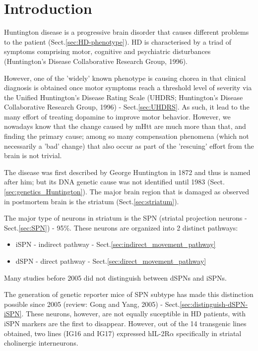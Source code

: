 \section{Introduction}
\label{sec:Huntington-disease}

Huntington disease is a progressive brain disorder that causes different
problems to the patient (Sect.\ref{sec:HD-phenotype}).
HD is characterised by a triad of symptoms comprising motor, cognitive and
psychiatric disturbances (Huntington's Disease Collaborative Research Group,
1996).

However, one of the 'widely' known phenotype is causing chorea in that clinical
diagnosis is obtained once motor symptoms reach a threshold level of severity
via the Unified Huntington's Disease Rating Scale (UHDRS; Huntington's Disease
Collaborative Research Group, 1996) - Sect.\ref{sec:UHDRS}. As such, it lead to
the many effort of treating dopamine to improve motor behavior. However, we nowadays know that the
change caused by mHtt are much more than that, and finding the primary cause;
among so many compensation phenomena (which not necessarily a 'bad' change) that
also occur as part of the 'rescuing' effort from the brain is not trivial.

The disease was first described by George Huntington in 1872 and thus is named
after him; but its DNA genetic cause was not identified until 1983
(Sect.\ref{sec:genetics_Huntington}). The major brain region that is damaged as
observed in postmortem brain is the striatum (Sect.\ref{sec:striatum}). 

The major type of neurons in striatum is the SPN (striatal projection neurons -
Sect.\ref{sec:SPN}) - 95\%. These neurons are organized into 2 distinct
pathways: 
\begin{itemize}
  \item iSPN - indirect pathway - Sect.\ref{sec:indirect_movement_pathway}
  
  \item dSPN - direct pathway - Sect.\ref{sec:direct_movement_pathway}
\end{itemize}
Many studies before 2005 did not distinguish between dSPNs and iSPNs.

The generation of genetic reporter mice of SPN subtype has made this distinction
possible since 2005 (review: Gong and Yang, 2005) -
Sect.\ref{sec:distinguish-dSPN-iSPN}. These neurons, however, are not equally
suceptible in HD patients, with iSPN markers are the first to disappear.
However, out of the 14 transgenic lines obtained, two lines (IG16 and IG17)
expressed hIL-2R$\alpha$ specifically in striatal cholinergic interneurons.


